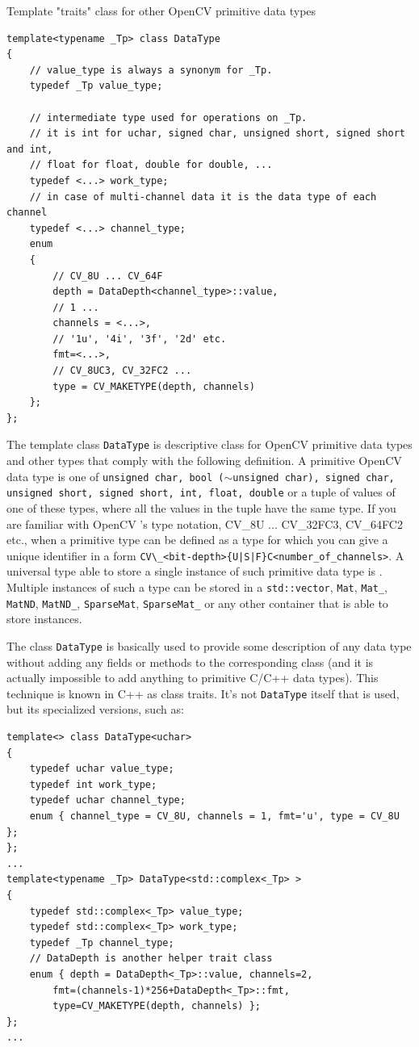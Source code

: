 \label{DataType}
Template "traits" class for other OpenCV primitive data types

\begin{lstlisting}
template<typename _Tp> class DataType
{
    // value_type is always a synonym for _Tp.
    typedef _Tp value_type;
    
    // intermediate type used for operations on _Tp.
    // it is int for uchar, signed char, unsigned short, signed short and int,
    // float for float, double for double, ...
    typedef <...> work_type;
    // in case of multi-channel data it is the data type of each channel
    typedef <...> channel_type;
    enum
    {
        // CV_8U ... CV_64F
        depth = DataDepth<channel_type>::value,
        // 1 ... 
        channels = <...>,
        // '1u', '4i', '3f', '2d' etc.
        fmt=<...>,
        // CV_8UC3, CV_32FC2 ...
        type = CV_MAKETYPE(depth, channels)
    };
};
\end{lstlisting}

The template class \texttt{DataType} is descriptive class for OpenCV primitive data types and other types that comply with the following definition. A primitive OpenCV data type is one of \texttt{unsigned char, bool ($\sim$unsigned char), signed char, unsigned short, signed short, int, float, double} or a tuple of values of one of these types, where all the values in the tuple have the same type. If you are familiar with OpenCV 's type notation, CV\_8U ... CV\_32FC3, CV\_64FC2 etc., when a primitive type can be defined as a type for which you can give a unique identifier in a form \verb*"CV\_<bit-depth>{U|S|F}C<number_of_channels>". A universal type able to store a single instance of such primitive data type is . Multiple instances of such a type can be stored in a \texttt{std::vector}, \texttt{Mat}, \texttt{Mat\_}, \texttt{MatND}, \texttt{MatND\_}, \texttt{SparseMat}, \texttt{SparseMat\_} or any other container that is able to store  instances.
 
The class \texttt{DataType} is basically used to provide some description of any data type without adding any fields or methods to the corresponding class (and it is actually impossible to add anything to primitive C/C++ data types). This technique is known in C++ as class traits. It's not \texttt{DataType} itself that is used, but its specialized versions, such as:

\begin{lstlisting}
template<> class DataType<uchar>
{
    typedef uchar value_type;
    typedef int work_type;
    typedef uchar channel_type;
    enum { channel_type = CV_8U, channels = 1, fmt='u', type = CV_8U };
};
...
template<typename _Tp> DataType<std::complex<_Tp> >
{
    typedef std::complex<_Tp> value_type;
    typedef std::complex<_Tp> work_type;
    typedef _Tp channel_type;
    // DataDepth is another helper trait class
    enum { depth = DataDepth<_Tp>::value, channels=2,
        fmt=(channels-1)*256+DataDepth<_Tp>::fmt,
        type=CV_MAKETYPE(depth, channels) };
};
...
\end{lstlisting}

